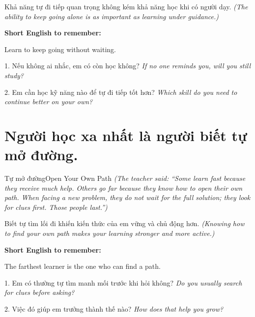 \begin{baihoc}
Khả năng tự đi tiếp quan trọng không kém khả năng học khi có người dạy.
\textit{(The ability to keep going alone is as important as learning under guidance.)}
\end{baihoc}

\begin{ghinhoanh}
\textbf{Short English to remember:}

Learn to keep going without waiting.

\end{ghinhoanh}

\begin{tuhocnhanh}
1. Nếu không ai nhắc, em có còn học không? \textit{If no one reminds you, will you still study?}

2. Em cần học kỹ năng nào để tự đi tiếp tốt hơn? \textit{Which skill do you need to continue better on your own?}
\end{tuhocnhanh}
\ngancach

\section{Người học xa nhất là người biết tự mở đường.}
\begin{truyen}{Tự mở đường}{Open Your Own Path}
\textit{(The teacher said: ``Some learn fast because they receive much help. Others go far because they know how to open their own path. When facing a new problem, they do not wait for the full solution; they look for clues first. Those people last.'')}
\end{truyen}

\begin{baihoc}
Biết tự tìm lối đi khiến kiến thức của em vững và chủ động hơn.
\textit{(Knowing how to find your own path makes your learning stronger and more active.)}
\end{baihoc}

\begin{ghinhoanh}
\textbf{Short English to remember:}

The farthest learner is the one who can find a path.

\end{ghinhoanh}

\begin{tuhocnhanh}
1. Em có thường tự tìm manh mối trước khi hỏi không? \textit{Do you usually search for clues before asking?}

2. Việc đó giúp em trưởng thành thế nào? \textit{How does that help you grow?}
\end{tuhocnhanh}
\ngancach

